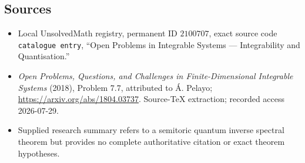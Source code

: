 \documentclass[11pt]{article}
\begin{document}
\subsection{Sources}
\begin{itemize}
\item Local UnsolvedMath registry, permanent ID \(2100707\), exact source code \texttt{catalogue entry}, ``Open Problems in Integrable Systems --- Integrability and Quantisation.''
\item \emph{Open Problems, Questions, and Challenges in Finite-Dimensional Integrable Systems} (2018), Problem 7.7, attributed to \'{A}. Pelayo; \url{https://arxiv.org/abs/1804.03737}. Source-TeX extraction; recorded access 2026-07-29.
\item Supplied research summary refers to a semitoric quantum inverse spectral theorem but provides no complete authoritative citation or exact theorem hypotheses.
\end{itemize}
\end{document}
